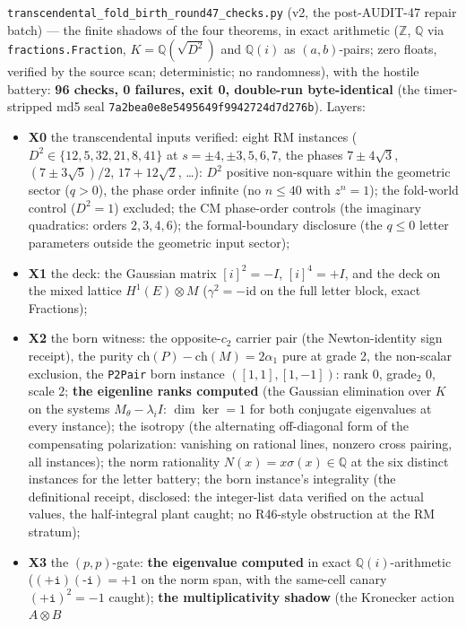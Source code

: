 \documentclass[11pt]{article}
\theoremstyle{definition}
\begin{document}
\texttt{transcendental\_fold\_birth\_round47\_checks.py} (v2, the
post-AUDIT-47 repair batch) --- the finite shadows of the four theorems,
in exact arithmetic ($\mathbb{Z}$, $\mathbb{Q}$ via
\texttt{fractions.Fraction}, $K=\mathbb{Q}(\sqrt{D^2})$ and
$\mathbb{Q}(i)$ as $(a,b)$-pairs; zero floats, verified by the source
scan; deterministic; no randomness), with the hostile battery: \textbf{96
checks, 0 failures, exit 0, double-run byte-identical} (the
timer-stripped md5 seal
\texttt{7a2bea0e8e5495649f9942724d7d276b}). Layers:
\begin{itemize}
\item \textbf{X0} the transcendental inputs verified: eight RM instances
($D^2\in\{12,5,32,21,8,41\}$ at $s=\pm4,\pm3,5,6,7$, the phases
$7\pm4\sqrt3$, $(7\pm3\sqrt5)/2$, $17+12\sqrt2$, \dots): $D^2$
positive non-square within the geometric sector ($q>0$), the phase
order infinite (no $n\le40$ with $z^n=1$); the fold-world control
($D^2=1$) excluded; the CM phase-order controls (the imaginary
quadratics: orders $2,3,4,6$); the formal-boundary disclosure (the
$q\le0$ letter parameters outside the geometric input sector);
\item \textbf{X1} the deck: the Gaussian matrix $[i]^2=-I$,
$[i]^4=+I$, and the deck on the mixed lattice $H^1(E)\otimes M$
($\gamma^2=-\mathrm{id}$ on the full letter block, exact Fractions);
\item \textbf{X2} the born witness: the opposite-$c_2$ carrier pair
(the Newton-identity sign receipt), the purity
$\mathrm{ch}(P)-\mathrm{ch}(M)=2\alpha_1$ pure at grade 2, the
non-scalar exclusion, the \texttt{P2Pair} born instance
$([1,1],[1,-1])$: rank $0$, grade$_2$ $0$, scale $2$; \textbf{the
eigenline ranks computed} (the Gaussian elimination over $K$ on the
systems $M_\theta-\lambda_iI$: $\dim\ker=1$ for both conjugate
eigenvalues at every instance); the isotropy (the alternating
off-diagonal form of the compensating polarization: vanishing on
rational lines, nonzero cross pairing, all instances); the norm
rationality $N(x)=x\sigma(x)\in\mathbb{Q}$ at the six distinct
instances for the letter battery; the born instance's integrality (the
definitional receipt, disclosed: the integer-list data verified on the
actual values, the half-integral plant caught; no R46-style obstruction
at the RM stratum);
\item \textbf{X3} the $(p,p)$-gate: \textbf{the eigenvalue computed}
in exact $\mathbb{Q}(i)$-arithmetic ($(\texttt{+i})(\texttt{-i})=+1$ on
the norm span, with the same-cell canary $(\texttt{+i})^2=-1$ caught);
\textbf{the multiplicativity shadow} (the Kronecker action $A\otimes B$

\end{itemize}
\end{document}
